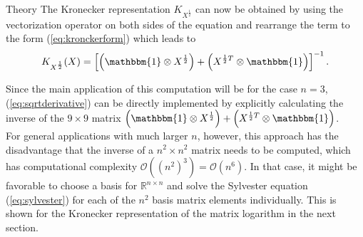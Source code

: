 \begin{chapter}{Theory}
The Kronecker representation $K_{X^{\frac{1}{2}}}$ can now be obtained by using the vectorization operator on both sides of the equation and rearrange the term
to the form (\ref{eq:kronckerform}) which leads to
\begin{equation}
	\label{eq:sqrtderivative}
    K_{X^{\frac{1}{2}}}(X)=\left[\left(\mathbbm{1}\otimes X^{\frac{1}{2}}\right)+\left(X^{\frac{1}{2}T}\otimes \mathbbm{1}\right) \right]^{-1}.
\end{equation}

Since the main application of this computation will be for the case $n=3$, (\ref{eq:sqrtderivative}) can
be directly implemented by explicitly calculating the inverse of the $9 \times 9$ matrix $\left(\mathbbm{1}\otimes X^{\frac{1}{2}}\right)+\left(X^{\frac{1}{2}T}\otimes \mathbbm{1}\right)$.\\

For general applications with much larger $n$, however, this approach has the disadvantage that the inverse of a $n^2\times n^2$ matrix needs to be computed, which has computational complexity
$\mathcal{O}((n^2)^3)=\mathcal{O}(n^6)$. In that case, it might be favorable to choose a basis for $\mathbb{R}^{n\times n}$ and solve the Sylvester equation (\ref{eq:sylvester}) for each of the $n^2$ basis matrix elements individually. This is shown for the Kronecker representation of the matrix logarithm in the next section.

%
%
%
%




\end{chapter}
